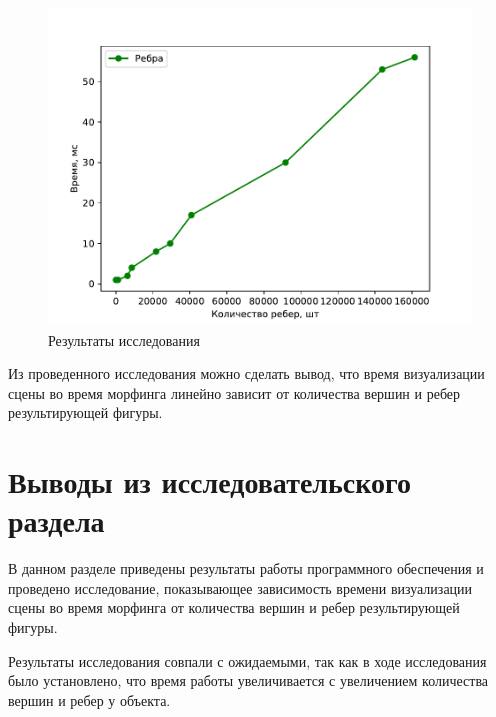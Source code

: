 \begin{figure}[h]
	\centering
	\includegraphics{images/tests_edges.pdf}
	\caption{Результаты исследования}
	\label{fig:res_tests_edges.pdf}
\end{figure}

\newpage

Из проведенного исследования можно сделать вывод, что время визуализации сцены во время морфинга линейно зависит от количества вершин и ребер результирующей фигуры.

\section*{Выводы из исследовательского раздела}

В данном разделе приведены результаты работы программного обеспечения и проведено исследование, показывающее зависимость времени визуализации сцены во время морфинга от количества вершин и ребер результирующей фигуры.

Результаты исследования совпали с ожидаемыми, так как в ходе исследования было установлено, что время работы увеличивается с увеличением количества вершин и ребер у объекта.
